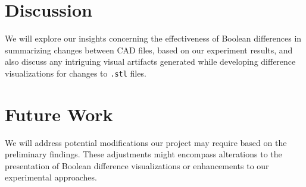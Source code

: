\documentclass[sigconf,authorversion,nonacm]{acmart}
\begin{document}
\section{Discussion}

We will explore our insights concerning the effectiveness of Boolean differences in summarizing changes between CAD files, based on our experiment results, and also discuss any intriguing visual artifacts generated while developing difference visualizations for changes to \texttt{.stl} files.

\section{Future Work}
We will address potential modifications our project may require based on the preliminary findings. These adjustments might encompass alterations to the presentation of Boolean difference visualizations or enhancements to our experimental approaches.



\appendix
\end{document}
